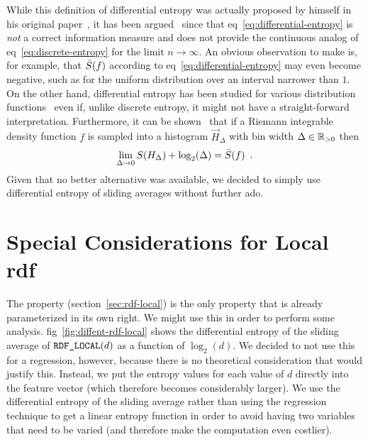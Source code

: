\documentclass{graphstudy}
\begin{document}
While this definition of differential entropy was actually proposed by \citeauthor*{Shannon1948} himself in his original
paper~\cite{Shannon1948}, it has been argued~\cite{Jaynes1963} since that \acl{eq}~\ref{eq:differential-entropy} is
\emph{not} a correct information measure and does not provide the continuous analog of
\acl{eq}~\ref{eq:discrete-entropy} for the limit \(n\to\infty\).  An obvious observation to make is, for example, that
\(\Entropy*(f)\) according to \acl{eq}~\ref{eq:differential-entropy} may even become negative, such as for the uniform
distribution over an interval narrower than \(1\).  On the other hand, differential entropy has been studied for various
distribution functions~\cite{Lazo1978} even if, unlike discrete entropy, it might not have a straight-forward
interpretation.  Furthermore, it can be shown~\cite[\acs{thm}~9.3.1, \acs{eq}~9.30]{Cover1991} that if a Riemann
integrable density function \(f\) is sampled into a histogram \(\Vec{H}_\Delta\) with bin width \(\Delta\in\RealsPos\)
then
\begin{equation}
  \lim_{\Delta\to0} \Entropy(\Vec{H}_\Delta) + \log_2(\Delta) = \Entropy*(f)
  \enspace.
\end{equation}
Given that no better alternative was available, we decided to simply use differential entropy of sliding averages
without further ado.

\section{Special Considerations for Local \acs*{rdf}}

The  property (\acs{section}~\ref{sec:rdf-local}) is the only property that is already parameterized in
its own right.  We might use this in order to perform some analysis.  \Acl{fig}~\ref{fig:diffent-rdf-local} shows the
differential entropy of the sliding average of \(\mbox{\text{\upshape\ttfamily RDF\_LOCAL}}(d)\) as a function of \(\log_2(d)\).  We decided to
not use this for a regression, however, because there is no theoretical consideration that would justify this.  Instead,
we put the entropy values for each value of \(d\) directly into the feature vector (which therefore becomes considerably
larger).  We use the differential entropy of the sliding average rather than using the regression technique to get
a linear entropy function in order to avoid having two variables that need to be varied (and therefore make the
computation even costlier).
\end{document}
